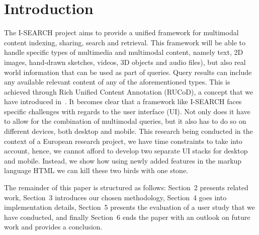 \documentclass[runningheads,a4paper]{llncs} \usepackage[utf8]{inputenc}
\begin{document}
\section{Introduction}
The \mbox{I-SEARCH} project aims to provide a unified framework for multimodal content indexing, sharing, search and retrieval. This framework will be able to handle specific types of multimedia and multimodal content, namely text, 2D images, hand-drawn sketches, videos, 3D objects and audio files), but also real world information that can be used as part of queries. Query results can include any available relevant content of any of the aforementioned types. This is achieved through Rich Unified Content Annotation (RUCoD), a concept that we have introduced in~\cite{ijmis}. It becomes clear that a framework like \mbox{I-SEARCH} faces specific challenges with regards to the user interface (UI). Not only does it have to allow for the combination of multimodal queries, but it also has to do so on different devices, both desktop and mobile. This research being conducted in the context of a European research project, we have time constraints to take into account, hence, we cannot afford to develop two separate UI stacks for desktop and mobile. Instead, we show how using newly added features in the markup language HTML  we can kill these two birds with one stone.

The remainder of this paper is structured as follows: Section~2 presents related work, Section~3 introduces our chosen methodology, Section~4 goes into implementation details, Section~5 presents the evaluation of a user study that we have conducted, and finally Section~6 ends the paper with an outlook on future work and provides a conclusion.
\end{document}
